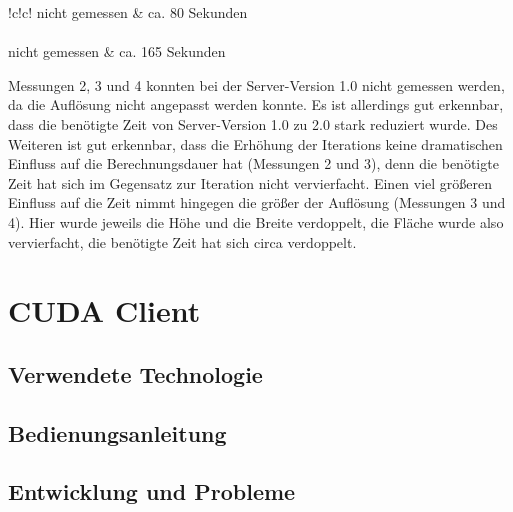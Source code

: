 \documentclass[12pt, onecolumn,notitlepage]{scrartcl}
\begin{document}
\begin{table}[H]
{\begin{tabular}{!{\color{black}\vrule}c!{\color{black}\vrule}c!{\color{black}\vrule}}
			\hline
			nicht
			gemessen     & ca.
			80 Sekunden                                                                                                                                                                            \\ 
			\hline
			        \\ 
			\hline
			nicht
			gemessen     & ca.
			165 Sekunden                                                                                                                                                                           \\
			\hline
		\end{tabular}
	}
	
\end{table}

Messungen 2, 3 und 4 konnten bei der Server-Version 1.0 nicht gemessen werden, da die Auflösung nicht angepasst werden konnte. Es ist allerdings gut erkennbar, dass die benötigte Zeit von Server-Version 1.0 zu 2.0 stark reduziert wurde. Des Weiteren ist gut erkennbar, dass die Erhöhung der Iterations keine dramatischen Einfluss auf die Berechnungsdauer hat (Messungen 2 und 3), denn die benötigte Zeit hat sich im Gegensatz zur Iteration nicht vervierfacht. Einen viel größeren Einfluss auf die Zeit nimmt hingegen die größer der Auflösung (Messungen 3 und 4). Hier wurde jeweils die Höhe und die Breite verdoppelt, die Fläche wurde also vervierfacht, die benötigte Zeit hat sich circa verdoppelt.


\section{CUDA Client}
\subsection{Verwendete Technologie}
\subsection{Bedienungsanleitung}
\subsection{Entwicklung und Probleme}
\end{document}
